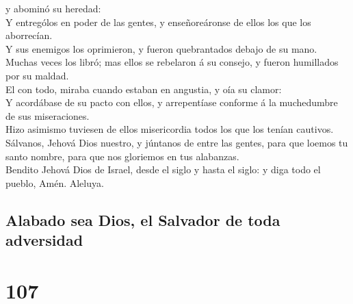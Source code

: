 y abominó su heredad:\\
 Y entrególos en poder de las gentes, y enseñoreáronse de
ellos los que los aborrecían.\\
 Y sus enemigos los oprimieron, y fueron quebrantados
debajo de su mano.\\
 Muchas veces los libró; mas ellos se rebelaron á su
consejo, y fueron humillados por su maldad.\\
 El con todo, miraba cuando estaban en angustia, y oía su
clamor:\\
 Y acordábase de su pacto con ellos, y arrepentíase
conforme á la muchedumbre de sus miseraciones.\\
 Hizo asimismo tuviesen de ellos misericordia todos los
que los tenían cautivos.\\
 Sálvanos, Jehová Dios nuestro, y júntanos de entre las
gentes, para que loemos tu santo nombre, para que nos gloriemos en tus
alabanzas.\\
 Bendito Jehová Dios de Israel, desde el siglo y hasta el
siglo: y diga todo el pueblo, Amén. Aleluya.

\hypertarget{alabado-sea-dios-el-salvador-de-toda-adversidad}{%
\subsection{Alabado sea Dios, el Salvador de toda
adversidad}\label{alabado-sea-dios-el-salvador-de-toda-adversidad}}

\hypertarget{section-106}{%
\section{107}\label{section-106}}

